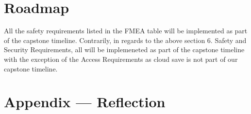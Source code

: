 \documentclass{article}
\begin{document}
\section{Roadmap}

All the safety requirements listed in the FMEA table will be implemented as part of the capstone timeline. Contrarily, in regards to the 
above section 6. Safety and Security Requirements, all will be implemeneted as part of the capstone timeline with the exception  
of the Access Requirements as cloud save is not part of our capstone timeline.

\newpage{}

\section*{Appendix --- Reflection}



\end{document}
